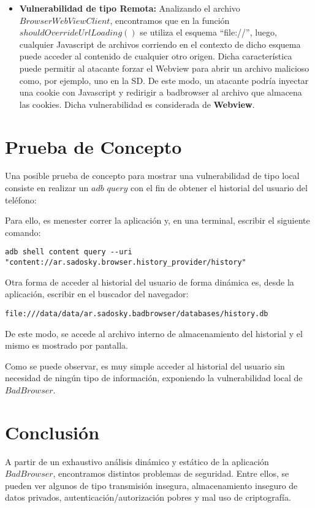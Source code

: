 \documentclass[10pt, a4paper]{article}
\begin{document}
\begin{itemize}
\item \textbf{Vulnerabilidad de tipo Remota:} Analizando el archivo $BrowserWebViewClient$, encontramos que en la función $shouldOverrideUrlLoading()$ se utiliza el esquema ``file://'', luego, cualquier Javascript de archivos corriendo en el contexto de dicho esquema puede acceder al contenido de cualquier otro origen. Dicha característica puede permitir al atacante forzar el Webview para abrir un archivo malicioso como, por ejemplo, uno en la SD. De este modo, un atacante podría inyectar una cookie con Javascript y redirigir a badbrowser al archivo que almacena las cookies. Dicha vulnerabilidad es considerada de \textbf{Webview}.
\end{itemize}

\newpage
\section{Prueba de Concepto}

Una posible prueba de concepto para mostrar una vulnerabilidad de tipo local consiste en realizar un $adb$ $query$ con el fin de obtener el historial del usuario del teléfono:

Para ello, es menester correr la aplicación y, en una terminal, escribir el siguiente comando:

\begin{verbatim}
adb shell content query --uri "content://ar.sadosky.browser.history_provider/history"
\end{verbatim}

Otra forma de acceder al historial del usuario de forma dinámica es, desde la aplicación, escribir en el buscador del navegador:
\begin{verbatim}
file:///data/data/ar.sadosky.badbrowser/databases/history.db
\end{verbatim}

De este modo, se accede al archivo interno de almacenamiento del historial y el mismo es mostrado por pantalla.

Como se puede observar, es muy simple acceder al historial del usuario sin necesidad de ningún tipo de información, exponiendo la vulnerabilidad local de $BadBrowser$.


\newpage
\section{Conclusión}

A partir de un exhaustivo análisis dinámico y estático de la aplicación $BadBrowser$, encontramos distintos problemas de seguridad. Entre ellos, se pueden ver algunos de tipo transmisión insegura, almacenamiento inseguro de datos privados, autenticación/autorización pobres y mal uso de criptografía. 
\end{document}
